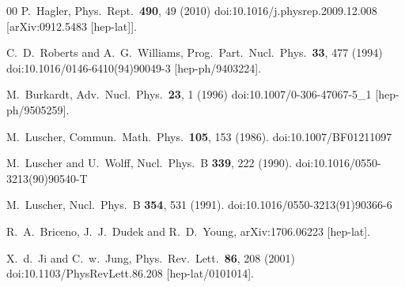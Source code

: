 \begin{thebibliography}{00}
	P.~Hagler,
	Phys.\ Rept.\  {\bf 490}, 49 (2010)
	doi:10.1016/j.physrep.2009.12.008
	[arXiv:0912.5483 [hep-lat]].


	C.~D.~Roberts and A.~G.~Williams,
	Prog.\ Part.\ Nucl.\ Phys.\  {\bf 33}, 477 (1994)
	doi:10.1016/0146-6410(94)90049-3
	[hep-ph/9403224].


	M.~Burkardt,
	Adv.\ Nucl.\ Phys.\  {\bf 23}, 1 (1996)
	doi:10.1007/0-306-47067-5\_1
	[hep-ph/9505259].


	M.~Luscher,
	Commun.\ Math.\ Phys.\  {\bf 105}, 153 (1986).
	doi:10.1007/BF01211097


	M.~Luscher and U.~Wolff,
	Nucl.\ Phys.\ B {\bf 339}, 222 (1990).
	doi:10.1016/0550-3213(90)90540-T


	M.~Luscher,
	Nucl.\ Phys.\ B {\bf 354}, 531 (1991).
	doi:10.1016/0550-3213(91)90366-6


	R.~A.~Briceno, J.~J.~Dudek and R.~D.~Young,
	arXiv:1706.06223 [hep-lat].



	X.~d.~Ji and C.~w.~Jung,
	Phys.\ Rev.\ Lett.\  {\bf 86}, 208 (2001)
	doi:10.1103/PhysRevLett.86.208
	[hep-lat/0101014].



\end{thebibliography}

